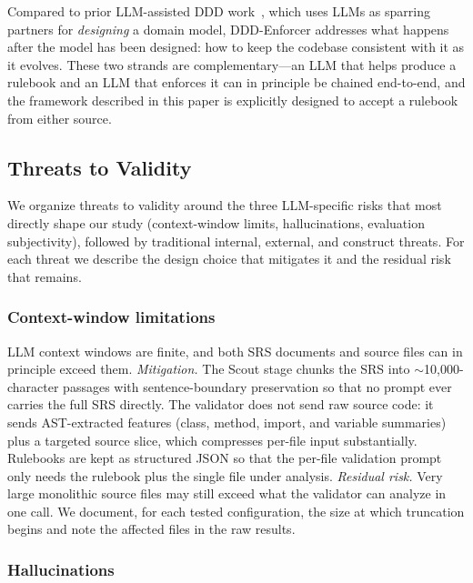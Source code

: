 \documentclass[smallextended]{svjour3}
\begin{document}
Compared to prior LLM-assisted DDD work~\cite{automatingddd2024,evans2024infoq}, which uses LLMs as sparring partners for \emph{designing} a domain model, DDD-Enforcer addresses what happens after the model has been designed: how to keep the codebase consistent with it as it evolves.
These two strands are complementary---an LLM that helps produce a rulebook and an LLM that enforces it can in principle be chained end-to-end, and the framework described in this paper is explicitly designed to accept a rulebook from either source.

\subsection{Threats to Validity}
\label{sec:threats}

We organize threats to validity around the three LLM-specific risks that most directly shape our study (context-window limits, hallucinations, evaluation subjectivity), followed by traditional internal, external, and construct threats.
For each threat we describe the design choice that mitigates it and the residual risk that remains.

\subsubsection{Context-window limitations}

LLM context windows are finite, and both SRS documents and source files can in principle exceed them.
\emph{Mitigation.}
The Scout stage chunks the SRS into $\sim$10{,}000-character passages with sentence-boundary preservation so that no prompt ever carries the full SRS directly.
The validator does not send raw source code: it sends AST-extracted features (class, method, import, and variable summaries) plus a targeted source slice, which compresses per-file input substantially.
Rulebooks are kept as structured JSON so that the per-file validation prompt only needs the rulebook plus the single file under analysis.
\emph{Residual risk.}
Very large monolithic source files may still exceed what the validator can analyze in one call.
We document, for each tested configuration, the size at which truncation begins and note the affected files in the raw results.

\subsubsection{Hallucinations}
\end{document}
